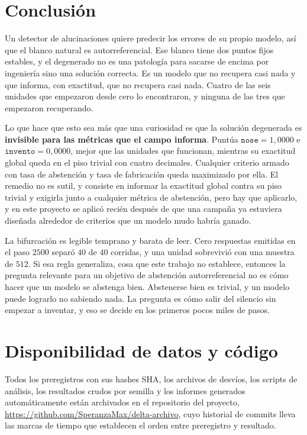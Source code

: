 \documentclass[11pt,a4paper]{article}
\begin{document}
\section{Conclusión}

Un detector de alucinaciones quiere predecir los errores de su propio modelo, así que el blanco natural
es autorreferencial. Ese blanco tiene dos puntos fijos estables, y el degenerado no es una patología
para sacarse de encima por ingeniería sino una solución correcta. Es un modelo que no recupera casi nada
y que informa, con exactitud, que no recupera casi nada. Cuatro de las seis unidades que empezaron
desde cero lo encontraron, y ninguna de las tres que empezaron recuperando.

Lo que hace que esto sea más que una curiosidad es que la solución degenerada es \textbf{invisible para
las métricas que el campo informa}. Puntúa $\texttt{nose} = 1{,}0000$ e $\texttt{invento} = 0{,}0000$,
mejor que las unidades que funcionan, mientras su exactitud global queda en el piso trivial con cuatro
decimales. Cualquier criterio armado con tasa de abstención y tasa de fabricación queda maximizado por
ella. El remedio no es sutil, y consiste en informar la exactitud global contra su piso trivial y
exigirla junto a cualquier métrica de abstención, pero hay que aplicarlo, y en este proyecto se aplicó
recién después de que una campaña ya estuviera diseñada alrededor de criterios que un modelo mudo habría
ganado.

La bifurcación es legible temprano y barata de leer. Cero respuestas emitidas en el paso $2500$ separó
$40$ de $40$ corridas, y una unidad sobrevivió con una muestra de $512$. Si esa regla generaliza, cosa
que este trabajo no establece, entonces la pregunta relevante para un objetivo de abstención
autorreferencial no es cómo hacer que un modelo se abstenga bien. Abstenerse bien es trivial, y un
modelo puede lograrlo no sabiendo nada. La pregunta es cómo salir del silencio sin empezar a inventar, y
eso se decide en los primeros pocos miles de pasos.

\section*{Disponibilidad de datos y código}

Todos los preregistros con sus hashes SHA, los archivos de desvíos, los scripts de análisis, los
resultados crudos por semilla y los informes generados automáticamente están archivados en el
repositorio del proyecto, \url{https://github.com/SperanzaMax/delta-archivo}, cuyo historial de commits
lleva las marcas de tiempo que establecen el orden entre preregistro y resultado.
\end{document}

